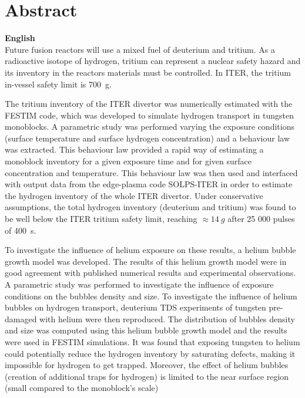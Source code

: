 \chapter*{Abstract}

\textbf{English} \\
Future fusion reactors will use a mixed fuel of deuterium and tritium.
As a radioactive isotope of hydrogen, tritium can represent a nuclear safety hazard and its inventory in the reactors materials must be controlled.
In ITER, the tritium in-vessel safety limit is \SI{700}{g}.

The tritium inventory of the ITER divertor was numerically estimated with the FESTIM code, which was developed to simulate hydrogen transport in tungsten monoblocks.
A parametric study was performed varying the exposure conditions (surface temperature and surface hydrogen concentration) and a behaviour law was extracted.
This behaviour law provided a rapid way of estimating a monoblock inventory for a given exposure time and for given surface concentration and temperature.
This behaviour law was then used and interfaced with output data from the edge-plasma code SOLPS-ITER in order to estimate the hydrogen inventory of the whole ITER divertor.
Under conservative assumptions, the total hydrogen inventory (deuterium and tritium) was found to be well below the ITER tritium safety limit, reaching $\approx \SI{14}{g}$ after 25 000 pulses of \SI{400}{s}.

To investigate the influence of helium exposure on these results, a helium bubble growth model was developed.
The results of this helium growth model were in good agreement with published numerical results and experimental observations.
A parametric study was performed to investigate the influence of exposure conditions on the bubbles density and size.
To investigate the influence of helium bubbles on hydrogen transport, deuterium TDS experiments of tungsten pre-damaged with helium were then reproduced.
The distribution of bubbles density and size was computed using this helium bubble growth model and the results were used in FESTIM simulations.
It was found that exposing tungsten to helium could potentially reduce the hydrogen inventory by saturating defects, making it impossible for hydrogen to get trapped.
Moreover, the effect of helium bubbles (creation of additional traps for hydrogen) is limited to the near surface region (small compared to the monoblock's scale)


